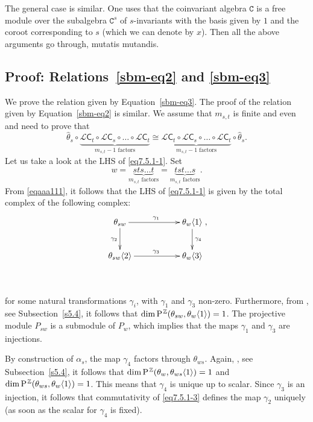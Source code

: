 \documentclass[a4paper]{amsart}
\newcommand{\cP}{\sc\mbox{P}\hspace{1.0pt}}
\begin{document}
The general case is similar. One uses that the coinvariant algebra
$\mathtt{C}$ is a free module over the subalgebra $\mathtt{C}^s$
of $s$-invariants with the basis given by $1$ and the coroot 
corresponding to $s$ (which we can denote by $x$). Then all the above
arguments go through, mutatis mutandis.

\subsection{Proof: Relations~\ref{sbm-eq2} and \ref{sbm-eq3}}\label{s7.5}

We prove the relation given by Equation~\ref{sbm-eq3}. The proof of 
the relation given by Equation~\ref{sbm-eq2} 
is similar. We assume that $m_{s,t}$ is finite and even and 
need to prove that 
\begin{equation}\label{eq7.5.1-1}
\hat{\theta}_s\circ 
\underbrace{\mathcal{L}\mathsf{C}_t\circ\mathcal{L}\mathsf{C}_s\circ\dots\circ
\mathcal{L}\mathsf{C}_t}_{m_{s,t}-1\text{ factors}}
\cong \underbrace{\mathcal{L}\mathsf{C}_t\circ\mathcal{L}\mathsf{C}_s\circ\dots\circ
\mathcal{L}\mathsf{C}_t}_{m_{s,t}-1\text{ factors}}
\circ \hat{\theta}_s. 
\end{equation}
Let us take a look at the LHS of \eqref{eq7.5.1-1}.  Set
\begin{displaymath}
w=\underbrace{sts\dots t}_{m_{s,t}\text{ factors}}
=\underbrace{tst\dots s}_{m_{s,t}\text{ factors}}.
\end{displaymath}
From \eqref{eqaaa111}, it follows that  the LHS of \eqref{eq7.5.1-1}
is given by the total complex of the following complex:
\begin{equation}\label{eq7.5.1-3}
\xymatrix{
\theta_{sw}\ar[rr]^{\gamma_1}\ar[d]_{\gamma_2}&&
\theta_{w}\ar[d]^{\gamma_4}\langle 1\rangle\\
\theta_{sw}\langle 2\rangle\ar[rr]^{\gamma_3}&&\theta_{w}\langle 3\rangle\\
&&
},
\end{equation}
for some natural transformations $\gamma_i$, with $\gamma_1$ and $\gamma_3$ non-zero.
Furthermore, from \cite{Bac01}, see Subsection~\ref{s5.4}, it follows that 
$\dim\cP^{\mathbb{Z}}(\theta_{sw},\theta_{w}\langle 1\rangle)=1$.
The projective module $P_{sw}$ is a submodule of $P_{w}$, which implies
that the maps $\gamma_1$ and $\gamma_3$ are injections. 

By construction of $\alpha_s$, the map $\gamma_4$ factors through
$\theta_{ws}$. Again, \cite{Bac01}, see Subsection~\ref{s5.4}, it follows that 
$\dim\cP^{\mathbb{Z}}(\theta_{w},\theta_{ws}\langle 1\rangle)=1$ and
$\dim\cP^{\mathbb{Z}}(\theta_{ws},\theta_{w}\langle 1\rangle)=1$. This means that
$\gamma_4$ is unique up to scalar. Since  $\gamma_3$ is an injection, it follows
that commutativity of \eqref{eq7.5.1-3} defines the map $\gamma_2$ uniquely
(as soon as the scalar for $\gamma_4$ is fixed).
\end{document}
